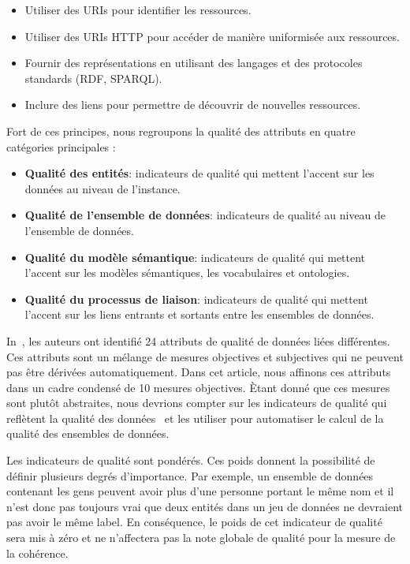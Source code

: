 \begin{itemize}
	\item Utiliser des URIs pour identifier les ressources.
	\item Utiliser des URIs HTTP pour acc\'{e}der de mani\`{e}re uniformis\'{e}e aux ressources.
	\item Fournir des repr\'{e}sentations en utilisant des langages et des protocoles standards (RDF, SPARQL).
	\item Inclure des liens pour permettre de d\'{e}couvrir de nouvelles ressources.
\end{itemize}

\noindent
Fort de ces principes, nous regroupons la qualit\'{e} des attributs en quatre cat\'{e}gories principales :

\begin{itemize}
	\item \textbf{Qualit\'{e} des entit\'{e}s}: indicateurs de qualit\'{e} qui mettent l'accent sur les donn\'{e}es au niveau de l'instance.
	\item \textbf{Qualit\'{e} de l'ensemble de donn\'{e}es}: indicateurs de qualit\'{e} au niveau de l'ensemble de donn\'{e}es.
	\item \textbf{Qualit\'{e} du mod\`{e}le s\'{e}mantique}: indicateurs de qualit\'{e} qui mettent l'accent sur les mod\`{e}les s\'{e}mantiques, les vocabulaires et ontologies.
	\item \textbf{Qualit\'{e} du processus de liaison}: indicateurs de qualit\'{e} qui mettent l'accent sur les liens entrants et sortants entre les ensembles de donn\'{e}es.
\end{itemize}

In~\cite{Assaf:DQMST:12}, les auteurs ont identifi\'{e} 24 attributs de qualit\'{e} de donn\'{e}es li\'{e}es diff\'{e}rentes. Ces attributs sont un m\'{e}lange de mesures objectives et subjectives qui ne peuvent pas \^{e}tre d\'{e}riv\'{e}es automatiquement. Dans cet article, nous affinons ces attributs dans un cadre condens\'{e} de 10 mesures objectives. \`{E}tant donn\'{e} que ces mesures sont plut\^{o}t abstraites, nous devrions compter sur les indicateurs de qualit\'{e} qui refl\`{e}tent la qualit\'{e} des donn\'{e}es~\cite{Flemming:Thesis:10} et les utiliser pour automatiser le calcul de la qualit\'{e} des ensembles de donn\'{e}es.

Les indicateurs de qualit\'{e} sont pond\'{e}r\'{e}s. Ces poids donnent la possibilit\'{e} de d\'{e}finir plusieurs degr\'{e}s d'importance. Par exemple, un ensemble de donn\'{e}es contenant les gens peuvent avoir plus d'une personne portant le m\^{e}me nom et il n'est donc pas toujours vrai que deux entit\'{e}s dans un jeu de donn\'{e}es ne devraient pas avoir le m\^{e}me label. En cons\'{e}quence, le poids de cet indicateur de qualit\'{e} sera mis \`{a} z\'{e}ro et ne n'affectera pas la note globale de qualit\'{e} pour la mesure de la coh\'{e}rence.

